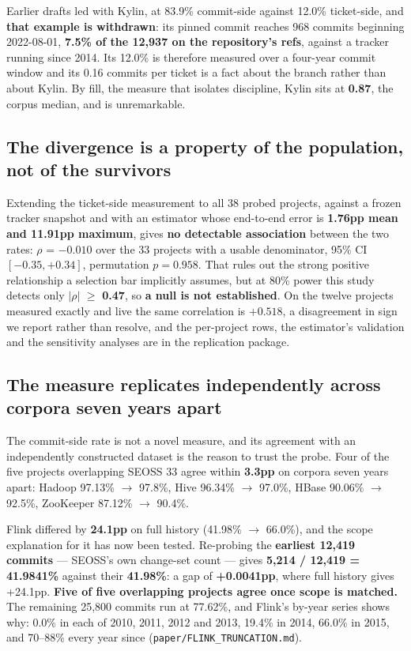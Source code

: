 \documentclass[sigconf,review,anonymous]{acmart}
\begin{document}
Earlier drafts led with Kylin, at 83.9\% commit-side against 12.0\% ticket-side, and \textbf{that example is withdrawn}: its pinned commit reaches 968 commits beginning 2022-08-01, \textbf{7.5\% of the 12,937 on the repository's refs}, against a tracker running since 2014. Its 12.0\% is therefore measured over a four-year commit window and its 0.16 commits per ticket is a fact about the branch rather than about Kylin. By fill, the measure that isolates discipline, Kylin sits at \textbf{0.87}, the corpus median, and is unremarkable.

\subsection{The divergence is a property of the population, not of the survivors}
\label{sec:4.3}

Extending the ticket-side measurement to all 38 probed projects, against a frozen tracker snapshot and with an estimator whose end-to-end error is \textbf{1.76pp mean and 11.91pp maximum}, gives \textbf{no detectable association} between the two rates: $\rho$ = \textbf{$-0.010$} over the 33 projects with a usable denominator, 95\% CI \textbf{$[-0.35, +0.34]$}, permutation $p = 0.958$. That rules out the strong positive relationship a selection bar implicitly assumes, but at 80\% power this study detects only $\lvert \rho \rvert$ $\geq$ \textbf{0.47}, so \textbf{a null is not established}. On the twelve projects measured exactly and live the same correlation is \textbf{$+0.518$}, a disagreement in sign we report rather than resolve, and the per-project rows, the estimator's validation and the sensitivity analyses are in the replication package.

\subsection{The measure replicates independently across corpora seven years apart}
\label{sec:4.4}

The commit-side rate is not a novel measure, and its agreement with an independently constructed dataset is the reason to trust the probe. Four of the five projects overlapping SEOSS 33 agree within \textbf{3.3pp} on corpora seven years apart: Hadoop 97.13\% $\rightarrow$ 97.8\%, Hive 96.34\% $\rightarrow$ 97.0\%, HBase 90.06\% $\rightarrow$ 92.5\%, ZooKeeper 87.12\% $\rightarrow$ 90.4\%.

Flink differed by \textbf{24.1pp} on full history (41.98\% $\rightarrow$ 66.0\%), and the scope explanation for it has now been tested. Re-probing the \textbf{earliest 12,419 commits} --- SEOSS's own change-set count --- gives \textbf{5,214 / 12,419 = 41.9841\%} against their \textbf{41.98\%}: a gap of \textbf{+0.0041pp}, where full history gives +24.1pp. \textbf{Five of five overlapping projects agree once scope is matched.} The remaining 25,800 commits run at 77.62\%, and Flink's by-year series shows why: 0.0\% in each of 2010, 2011, 2012 and 2013, 19.4\% in 2014, 66.0\% in 2015, and 70--88\% every year since (\texttt{paper/\allowbreak{}FLINK\_\allowbreak{}TRUNCATION.\allowbreak{}md}).
\end{document}
